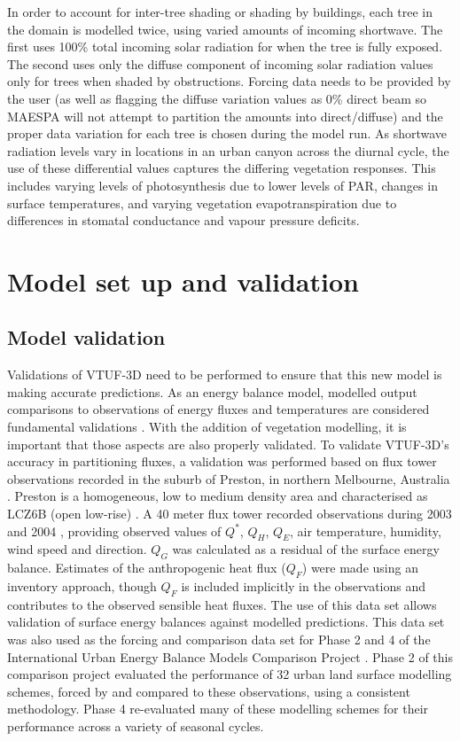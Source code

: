 \documentclass[final,3p,times,authoryear]{elsarticle}
\begin{document}
In order to account for inter-tree shading or shading by buildings, each tree in the domain is modelled twice, using varied amounts of incoming shortwave. The first uses 100\% total incoming solar radiation for when the tree is fully exposed. The second uses only the diffuse component of incoming solar radiation values only for trees when shaded by obstructions. Forcing data needs to be provided by the user (as well as flagging the diffuse variation values as 0\% direct beam so MAESPA will not attempt to partition the amounts into direct/diffuse) and the proper data variation for each tree is chosen during the model run. As shortwave radiation levels vary in locations in an urban canyon across the diurnal cycle, the use of these differential values captures the differing vegetation responses. This includes varying levels of photosynthesis due to lower levels of PAR, changes in surface temperatures, and varying vegetation evapotranspiration due to differences in stomatal conductance and vapour pressure deficits.

\section{Model set up and validation}
\subsection{Model validation}\label{sec:Validation}


Validations of VTUF-3D need to be performed to ensure that this new model is making accurate predictions. As an energy balance model, modelled output comparisons to observations of energy fluxes and temperatures are considered fundamental validations \citep{Masson2002a}. With the addition of vegetation modelling, it is important that those aspects are also properly validated. To validate VTUF-3D's accuracy in partitioning fluxes, a validation was performed based on flux tower observations recorded in the suburb of Preston, in northern Melbourne, Australia \citep{Coutts2007}. Preston is a homogeneous, low to medium density area and characterised as LCZ6B (open low-rise) \citep{Stewart2012b}. A 40 meter flux tower recorded observations during 2003 and 2004 \citep{Coutts2007}, providing observed values of $Q^{*}$, $Q_{H}$, $Q_{E}$, air temperature, humidity, wind speed and direction. $Q_{G}$ was calculated as a residual of the surface energy balance. Estimates of the anthropogenic heat flux ($Q_{F}$) were made using an inventory approach, though $Q_{F}$ is included implicitly in the observations and contributes to the observed sensible heat fluxes. The use of this data set allows validation of surface energy balances against modelled predictions. This data set was also used as the forcing and comparison data set for Phase 2 and 4 of the International Urban Energy Balance Models Comparison Project \citep{Grimmond2011,Best2012}. Phase 2 of this comparison project evaluated the performance of 32 urban land surface modelling schemes, forced by and compared to these observations, using a consistent methodology. Phase 4 re-evaluated many of these modelling schemes for their performance across a variety of seasonal cycles.
\end{document}
